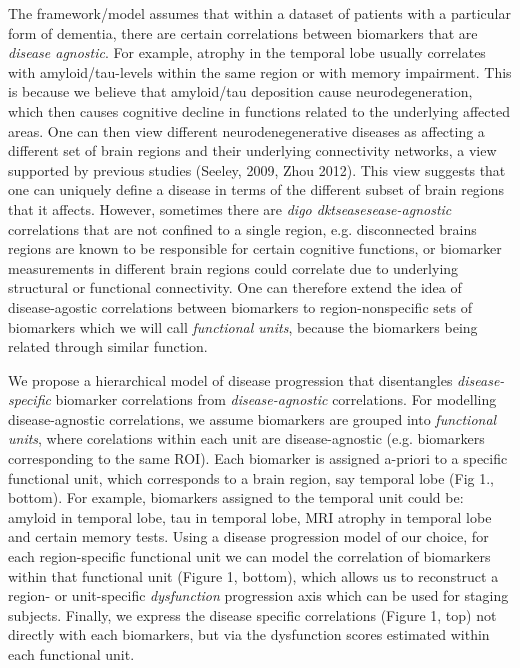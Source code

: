 \documentclass[11pt,a4paper]{article}
\begin{document}
The framework/model assumes that within a dataset of patients with a particular form of dementia, there are certain correlations between biomarkers that are \emph{disease agnostic}. For example, atrophy in the temporal lobe usually correlates with amyloid/tau-levels within the same region or with memory impairment. This is because we believe that amyloid/tau deposition cause neurodegeneration, which then causes cognitive decline in functions related to the underlying affected areas. One can then view different neurodenegenerative diseases as affecting a different set of brain regions and their underlying connectivity networks, a view supported by previous studies (Seeley, 2009, Zhou 2012). This view suggests that one can uniquely define a disease in terms of the different subset of brain regions that it affects. However, sometimes there are \emph{digo dktseasesease-agnostic} correlations that are not confined to a single region, e.g. disconnected brains regions are known to be responsible for certain cognitive functions, or biomarker measurements in different brain regions could correlate due to underlying structural or functional connectivity. One can therefore extend the idea of disease-agostic correlations between biomarkers to region-nonspecific sets of biomarkers which we will call \emph{functional units}, because the biomarkers being related through similar function.

We propose a hierarchical model of disease progression that disentangles \emph{disease-specific} biomarker correlations from \emph{disease-agnostic} correlations. For modelling disease-agnostic correlations, we assume biomarkers are grouped into \emph{functional units}, where corelations within each unit are disease-agnostic (e.g. biomarkers corresponding to the same ROI).  Each biomarker is assigned a-priori to a specific functional unit, which corresponds to a brain region, say temporal lobe (Fig 1., bottom).  For example, biomarkers assigned to the temporal unit could be: amyloid in temporal lobe, tau in temporal lobe, MRI atrophy in temporal lobe and certain memory tests. Using a disease progression model of our choice, for each region-specific functional unit we can model the correlation of biomarkers within that functional unit (Figure 1, bottom), which allows us to reconstruct a region- or unit-specific \emph{dysfunction} progression axis which can be used for staging subjects. Finally, we express the disease specific correlations (Figure 1, top) not directly with each biomarkers, but via the dysfunction scores estimated within each functional unit.  
\end{document}
